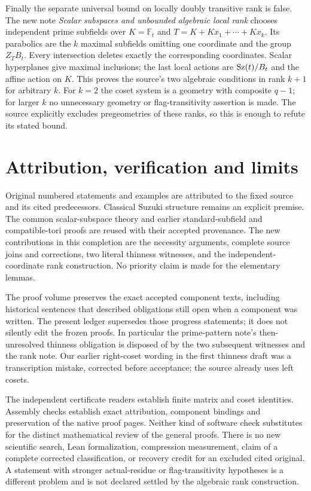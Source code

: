 \documentclass[11pt,a4paper]{article}
\newcommand{\F}{\mathbb F}
\begin{document}
Finally the separate universal bound on locally doubly transitive rank
is false. The new note \emph{Scalar subspaces and unbounded algebraic
local rank} chooses independent prime subfields over $K=\F_t$ and
$T=K+Kx_1+\cdots+Kx_k$. Its parabolics are the $k$ maximal
subfields omitting one coordinate and the group $Z_TB_t$.
Every intersection deletes exactly the corresponding coordinates.
Scalar hyperplanes give maximal inclusions; the last local actions
are $\operatorname{Sz}(t)/B_t$ and the affine action on $K$. This proves the
source's two algebraic conditions in rank $k+1$ for arbitrary $k$.
For $k=2$ the coset system is a geometry with composite $q-1$;
for larger $k$ no unnecessary geometry or flag-transitivity assertion
is made. The source explicitly excludes pregeometries of these ranks,
so this is enough to refute its stated bound.

\section{Attribution, verification and limits}
Original numbered statements and examples are attributed to the fixed
source and its cited predecessors. Classical Suzuki structure remains
an explicit premise. The common scalar-subspace theory and earlier
standard-subfield and compatible-tori proofs are reused with their
accepted provenance. The new contributions in this completion are the
necessity arguments, complete source joins and corrections, two literal
thinness witnesses, and the independent-coordinate rank construction.
No priority claim is made for the elementary lemmas.

The proof volume preserves the exact accepted component texts, including
historical sentences that described obligations still open when a
component was written. The present ledger supersedes those progress
statements; it does not silently edit the frozen proofs. In particular
the prime-pattern note's then-unresolved thinness obligation is disposed
of by the two subsequent witnesses and the rank note. Our earlier
right-coset wording in the first thinness draft was a transcription
mistake, corrected before acceptance; the source already uses left cosets.

The independent certificate readers establish finite matrix and coset
identities. Assembly checks establish exact attribution, component
bindings and preservation of the native proof pages. Neither kind of
software check substitutes for the distinct mathematical review of the
general proofs. There is no new scientific search, Lean formalization,
compression measurement, claim of a complete corrected classification,
or recovery credit for an excluded cited original. A statement with
stronger actual-residue or flag-transitivity hypotheses is a different
problem and is not declared settled by the algebraic rank construction.
\end{document}
